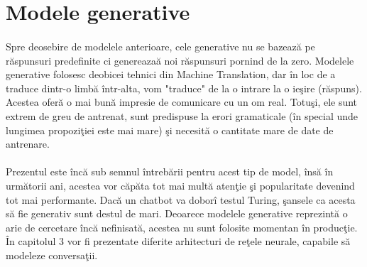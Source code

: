 \section{Modele generative}

\paragraph{}
Spre deosebire de modelele anterioare, cele generative nu se bazeaz\u a pe r\u aspunsuri predefinite ci genereaza\u a noi r\u aspunsuri pornind de la zero. Modelele generative folosesc deobicei tehnici din Machine Translation, dar \^ in loc de a traduce dintr-o limb\u a \^ intr-alta, vom "traduce" de la o intrare la o ie\c sire (r\u aspuns). Acestea ofer\u a o mai bun\u a impresie de comunicare cu un om real. Totu\c si, ele sunt extrem de greu de antrenat, sunt predispuse la erori gramaticale (\^ in special unde lungimea propozi\c tiei este mai mare) \c si necesit\u a o cantitate mare de date de antrenare.

\paragraph{}
Prezentul este \^ inc\u a sub semnul \^ intreb\u arii pentru acest tip de model, \^ ins\u a \^ in urm\u atorii ani, acestea vor c\u ap\u ata tot mai mult\u a aten\c tie \c si popularitate devenind tot mai performante. Dac\u a un chatbot va dobor\^ i testul Turing, \c sansele ca acesta s\u a fie generativ sunt destul de mari. Deoarece modelele generative reprezint\u a o arie de cercetare \^ inc\u a nefinisat\u a, acestea nu sunt folosite momentan \^ in produc\c tie. \^ In capitolul 3 vor fi prezentate diferite arhitecturi de re\c tele neurale, capabile s\u a modeleze conversa\c tii.